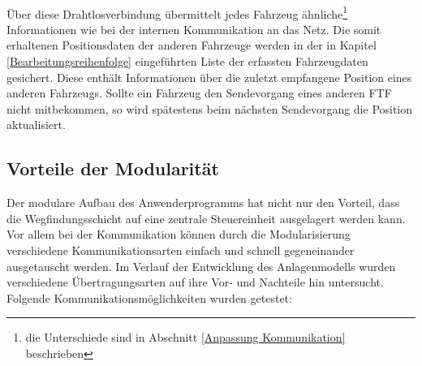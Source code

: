 		\\
		Über diese Drahtlosverbindung übermittelt jedes Fahrzeug ähnliche\footnote{die Unterschiede sind in Abschnitt \ref{Anpassung Kommunikation} beschrieben} Informationen wie bei der internen Kommunikation an das Netz. Die somit erhaltenen Positionsdaten der anderen Fahrzeuge werden in der in Kapitel \ref{Bearbeitungsreihenfolge} eingeführten Liste der erfassten Fahrzeugdaten gesichert. Diese enthält Informationen über die zuletzt empfangene Position eines anderen Fahrzeugs. Sollte ein Fahrzeug den Sendevorgang eines anderen \ac{FTF} nicht mitbekommen, so wird spätestens beim nächsten Sendevorgang die Position aktualisiert.
		
	\subsection{Vorteile der Modularität}
		
		Der modulare Aufbau des Anwenderprogramms hat nicht nur den Vorteil, dass die Wegfindungsschicht auf eine zentrale Steuereinheit ausgelagert werden kann. Vor allem bei der Kommunikation können durch die Modularisierung verschiedene Kommunikationsarten einfach und schnell gegeneinander ausgetauscht werden. Im Verlauf der Entwicklung des Anlagenmodells wurden verschiedene Übertragungsarten auf ihre Vor- und Nachteile hin untersucht.
		Folgende Kommunikationsmöglichkeiten wurden getestet:
		
